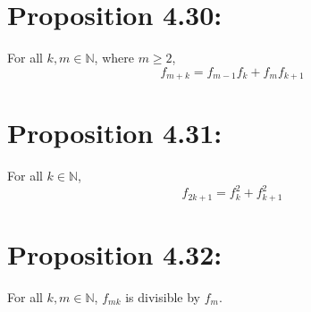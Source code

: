 \section*{Proposition 4.30:}
For all $k,m \in \mathbb{N}$, where $m \geq 2$,
\[ f_{m+k} = f_{m-1} f_k + f_m f_{k+1} \]

\section*{Proposition 4.31:}
For all $k \in \mathbb{N}$,
\[ f_{2k+1} = f_k^2 + f_{k+1}^2 \]

\section*{Proposition 4.32:}
For all $k,m \in \mathbb{N}$, $f_{mk}$ is divisible by $f_m$.
